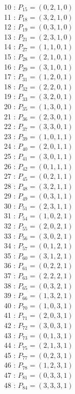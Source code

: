\documentclass{article}
\begin{document}
{\begin{multicols}{3}
10 : $P_{15}=( 0, 2, 1, 0 )$\\
11 : $P_{18}=( 3, 2, 1, 0 )$\\
12 : $P_{19}=( 0, 3, 1, 0 )$\\
13 : $P_{21}=( 2, 3, 1, 0 )$\\
14 : $P_{27}=( 1, 1, 0, 1 )$\\
15 : $P_{28}=( 2, 1, 0, 1 )$\\
16 : $P_{29}=( 3, 1, 0, 1 )$\\
17 : $P_{31}=( 1, 2, 0, 1 )$\\
18 : $P_{32}=( 2, 2, 0, 1 )$\\
19 : $P_{33}=( 3, 2, 0, 1 )$\\
20 : $P_{35}=( 1, 3, 0, 1 )$\\
21 : $P_{36}=( 2, 3, 0, 1 )$\\
22 : $P_{37}=( 3, 3, 0, 1 )$\\
23 : $P_{39}=( 1, 0, 1, 1 )$\\
24 : $P_{40}=( 2, 0, 1, 1 )$\\
25 : $P_{41}=( 3, 0, 1, 1 )$\\
26 : $P_{42}=( 0, 1, 1, 1 )$\\
27 : $P_{45}=( 0, 2, 1, 1 )$\\
28 : $P_{48}=( 3, 2, 1, 1 )$\\
29 : $P_{49}=( 0, 3, 1, 1 )$\\
30 : $P_{51}=( 2, 3, 1, 1 )$\\
31 : $P_{54}=( 1, 0, 2, 1 )$\\
32 : $P_{55}=( 2, 0, 2, 1 )$\\
33 : $P_{56}=( 3, 0, 2, 1 )$\\
34 : $P_{57}=( 0, 1, 2, 1 )$\\
35 : $P_{60}=( 3, 1, 2, 1 )$\\
36 : $P_{61}=( 0, 2, 2, 1 )$\\
37 : $P_{63}=( 2, 2, 2, 1 )$\\
38 : $P_{65}=( 0, 3, 2, 1 )$\\
39 : $P_{66}=( 1, 3, 2, 1 )$\\
40 : $P_{70}=( 1, 0, 3, 1 )$\\
41 : $P_{71}=( 2, 0, 3, 1 )$\\
42 : $P_{72}=( 3, 0, 3, 1 )$\\
43 : $P_{73}=( 0, 1, 3, 1 )$\\
44 : $P_{75}=( 2, 1, 3, 1 )$\\
45 : $P_{77}=( 0, 2, 3, 1 )$\\
46 : $P_{78}=( 1, 2, 3, 1 )$\\
47 : $P_{81}=( 0, 3, 3, 1 )$\\
48 : $P_{84}=( 3, 3, 3, 1 )$\\
\end{multicols}


}
\end{document}
